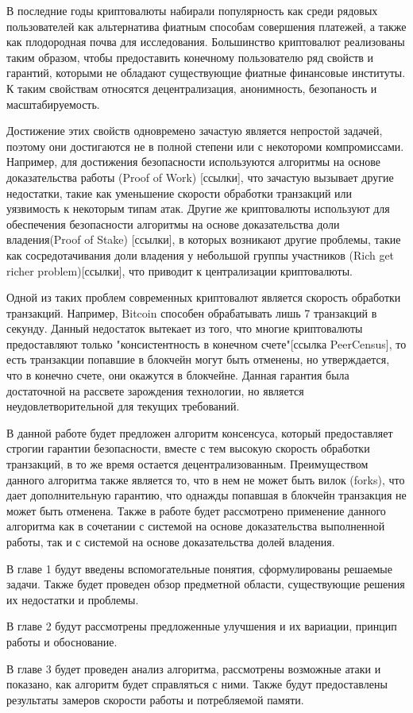 \startprefacepage
В последние годы криптовалюты набирали популярность как среди рядовых пользователей как альтернатива фиатным способам совершения платежей, а также как плодородная почва для исследования.
Большинство криптовалют реализованы таким образом, чтобы предоставить конечному пользователю ряд свойств и гарантий, которыми не обладают существующие фиатные финансовые институты. К таким свойствам относятся децентрализация, анонимность, безопаность и масштабируемость.
 
Достижение этих свойств одновремено зачастую является непростой задачей, 
поэтому они достигаются не в полной степени или с некотороми компромиссами.
Например, для достижения безопасности используются алгоритмы на основе доказательства работы (Proof of Work) [ссылки],
что зачастую вызывает другие недостатки, такие как уменьшение скорости обработки транзакций или уязвимость к некоторым типам атак.
Другие же криптовалюты используют для обеспечения безопасности алгоритмы на основе доказательства доли владения(Proof of Stake) [ссылки], в которых 
возникают другие проблемы, такие как сосредотачивания доли владения у небольшой группы участников (Rich get richer  problem)[ссылки],
что приводит к централизации криптовалюты.

Одной из таких проблем современных криптовалют является скорость обработки транзакций. 
Например, Bitcoin способен обрабатывать лишь 7 транзакций в секунду. Данный недостаток вытекает из того,
 что многие криптовалюты предоставляют только "консистентность в конечном счете"[ссылка PeerCensus], то есть транзакции попавшие в блокчейн могут 
быть отменены, но утверждается, что в конечно счете, они окажутся в блокчейне. 
Данная гарантия была достаточной на рассвете зарождения технологии,  но является неудовлетворительной для текущих требований.

В данной работе будет предложен алгоритм консенсуса, который предоставляет строгии гарантии безопасности, 
вместе с тем высокую скорость обработки транзакций, в то же время остается децентрализованным.
Преимуществом данного алгоритма также является то, что в нем не может быть вилок (forks), 
что дает дополнительную гарантию, что однажды попавшая в блокчейн транзакция не может быть отменена.
Также в работе будет рассмотрено применение данного алгоритма как в сочетании с системой на основе доказательства выполненной работы,
так и с системой на основе доказательства долей владения.

В главе 1 будут введены вспомогательные понятия, сформулированы решаемые задачи.
Также будет проведен обзор предметной области, существующие решения их недостатки и проблемы.

В главе 2 будут рассмотрены предложенные улучшения и их вариации, принцип работы и обоснование.

В главе 3 будет проведен анализ алгоритма, рассмотрены возможные атаки и показано, как алгоритм будет справляться с ними.
Также будут предоставлены результаты замеров скорости работы и потребляемой памяти.